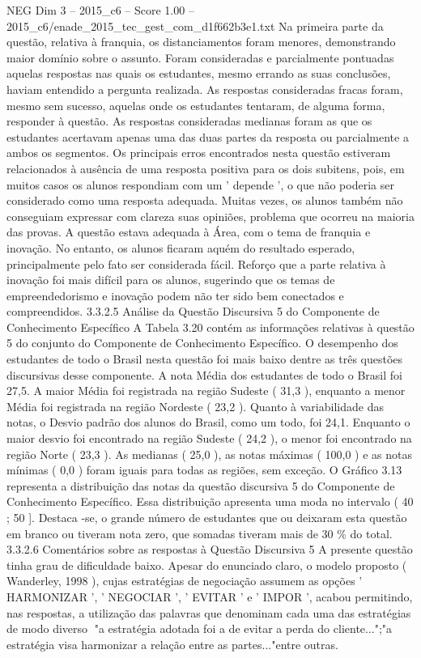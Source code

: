 \begin{textsample}{NEG Dim 3 – 2015\_c6 – Score 1.00 – 2015\_c6/enade\_2015\_tec\_gest\_com\_d1f662b3e1.txt}
Na primeira parte da questão, relativa à franquia, os distanciamentos foram menores, demonstrando maior domínio sobre o assunto.
Foram consideradas e parcialmente pontuadas aquelas respostas nas quais os estudantes, mesmo errando as suas conclusões, haviam entendido a pergunta realizada.
As respostas consideradas fracas foram, mesmo sem sucesso, aquelas onde os estudantes tentaram, de alguma forma, responder à questão.
As respostas consideradas medianas foram as que os estudantes acertavam apenas uma das duas partes da resposta ou parcialmente a ambos os segmentos.
Os principais erros encontrados nesta questão estiveram relacionados à ausência de uma resposta positiva para os dois subitens, pois, em muitos casos os alunos respondiam com um ' depende ', o que não poderia ser considerado como uma resposta adequada.
Muitas vezes, os alunos também não conseguiam expressar com clareza suas opiniões, problema que ocorreu na maioria das provas.
A questão estava adequada à Área, com o tema de franquia e inovação.
No entanto, os alunos ficaram aquém do resultado esperado, principalmente pelo fato ser considerada fácil.
Reforço que a parte relativa à inovação foi mais difícil para os alunos, sugerindo que os temas de empreendedorismo e inovação podem não ter sido bem conectados e compreendidos. 3.3.2.5 Análise da Questão Discursiva 5 do Componente de Conhecimento Específico A Tabela 3.20 contém as informações relativas à questão 5 do conjunto do Componente de Conhecimento Específico.
O desempenho dos estudantes de todo o Brasil nesta questão foi mais baixo dentre as três questões discursivas desse componente.
A nota Média dos estudantes de todo o Brasil foi 27,5.
A maior Média foi registrada na região Sudeste ( 31,3 ), enquanto a menor Média foi registrada na região Nordeste ( 23,2 ).
Quanto à variabilidade das notas, o Desvio padrão dos alunos do Brasil, como um todo, foi 24,1.
Enquanto o maior desvio foi encontrado na região Sudeste ( 24,2 ), o menor foi encontrado na região Norte ( 23,3 ).
As medianas ( 25,0 ), as notas máximas ( 100,0 ) e as notas mínimas ( 0,0 ) foram iguais para todas as regiões, sem exceção.
O Gráfico 3.13 representa a distribuição das notas da questão discursiva 5 do Componente de Conhecimento Específico.
Essa distribuição apresenta uma moda no intervalo ( 40 ; 50 ].
Destaca -se, o grande número de estudantes que ou deixaram esta questão em branco ou tiveram nota zero, que somadas tiveram mais de 30 \% do total. 3.3.2.6 Comentários sobre as respostas à Questão Discursiva 5 A presente questão tinha grau de dificuldade baixo.
Apesar do enunciado claro, o modelo proposto ( Wanderley, 1998 ), cujas estratégias de negociação assumem as opções ' HARMONIZAR ', ' NEGOCIAR ', ' EVITAR ' e ' IMPOR ', acabou permitindo, nas respostas, a utilização das palavras que denominam cada uma das estratégias de modo diverso "a estratégia adotada foi a de evitar a perda do cliente...";"a estratégia visa harmonizar a relação entre as partes..."entre outras.

\end{textsample}
